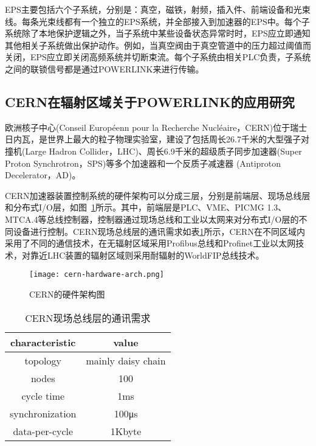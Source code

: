 EPS主要包括六个子系统，分别是：真空，磁铁，射频，插入件、前端设备和光束线。每条光束线都有一个独立的EPS系统，并全部接入到加速器的EPS中。每个子系统除了本地保护逻辑之外，当子系统中某些设备状态异常时时，EPS应立即通知其他相关子系统做出保护动作。例如，当真空阀由于真空管道中的压力超过阈值而关闭，EPS应立即关闭高频系统并切断束流。每个子系统由相关PLC负责，子系统之间的联锁信号都是通过POWERLINK来进行传输。


\subsection{CERN在辐射区域关于POWERLINK的应用研究}
欧洲核子中心(Conseil Européenn pour la Recherche Nucléaire，CERN)位于瑞士日内瓦，是世界上最大的粒子物理实验室，建设了包括周长26.7千米的大型强子对撞机(Large Hadron Collider，LHC)、周长6.9千米的超级质子同步加速器(Super Proton Synchrotron，SPS)等多个加速器和一个反质子减速器 (Antiproton Decelerator，AD)。

CERN加速器装置控制系统的硬件架构可以分成三层，分别是前端层、现场总线层和分布式I/O层，如图~\ref{fig:cern-hardware-arch}所示。其中，前端层是PLC、VME、PICMG 1.3、MTCA.4等总线控制器，控制器通过现场总线和工业以太网来对分布式I/O层的不同设备进行控制。CERN现场总线层的通讯需求如表\ref{table:1.1}所示，CERN在不同区域内采用了不同的通信技术，在无辐射区域采用Profibus总线和Profinet工业以太网技术，对靠近LHC装置的辐射区域则采用耐辐射的WorldFIP总线技术\cite{Daniluk2017}。

\begin{figure}[!htb]
	\centering
	\texttt{[image: cern-hardware-arch.png]}
	\caption{CERN的硬件架构图}
	\label{fig:cern-hardware-arch}
\end{figure}

\begin{table}[hbt]
  \centering
  \caption{CERN现场总线层的通讯需求}
  \label{table:1.1}
  \setlength{\tabcolsep}{15mm}
  \begin{tabular}{cc}
    \toprule

    characteristic & value\\
    \midrule
    topology & mainly daisy chain\\
    
    nodes & 100\\
    
    cycle time & 1ms\\
    
    synchronization  & 100μs\\
    
    data-per-cycle & 1Kbyte\\              
    \bottomrule
  \end{tabular}

\end{table}

